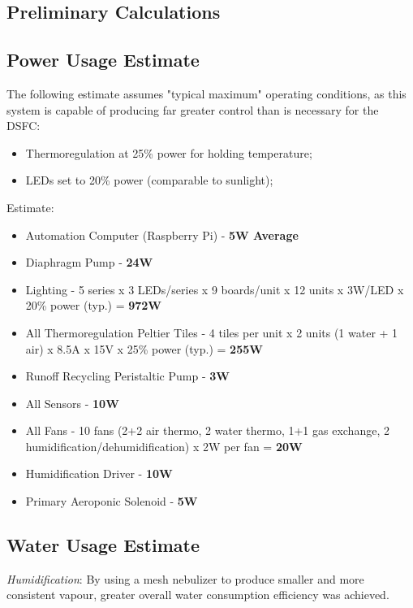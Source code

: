 \documentclass{report}
\begin{document}
\begin{spacing}{0.5}
\small

\section{Preliminary Calculations}

\subsection{Power Usage Estimate}
\label{app:power}

The following estimate assumes "typical maximum" operating conditions, as this system is capable of producing far greater control than is necessary for the DSFC:
\begin{itemize}
    \item Thermoregulation at 25\% power for holding temperature;
    \item LEDs set to 20\% power (comparable to sunlight);
\end{itemize}

Estimate:
\begin{itemize}
    \item Automation Computer (Raspberry Pi) - \textbf{5W Average}
    \item Diaphragm Pump - \textbf{24W} 
    \item Lighting - 5 series x 3 LEDs/series x 9 boards/unit x 12 units x 3W/LED x 20\% power (typ.) = \textbf{972W}
    \item All Thermoregulation Peltier Tiles - 4 tiles per unit x 2 units (1 water + 1 air) x 8.5A x 15V x 25\% power (typ.) = \textbf{255W}
    \item Runoff Recycling Peristaltic Pump - \textbf{3W}
    \item All Sensors - \textbf{10W}
    \item All Fans - 10 fans (2+2 air thermo, 2 water thermo, 1+1 gas exchange, 2 humidification/dehumidification) x 2W per fan = \textbf{20W}
    \item Humidification Driver - \textbf{10W}
    \item Primary Aeroponic Solenoid - \textbf{5W}
\end{itemize}

\subsection{Water Usage Estimate}
\label{app:water}

\textit{Humidification}: By using a mesh nebulizer to produce smaller and more consistent vapour, greater overall water consumption efficiency was achieved.


\end{spacing}
\end{document}
